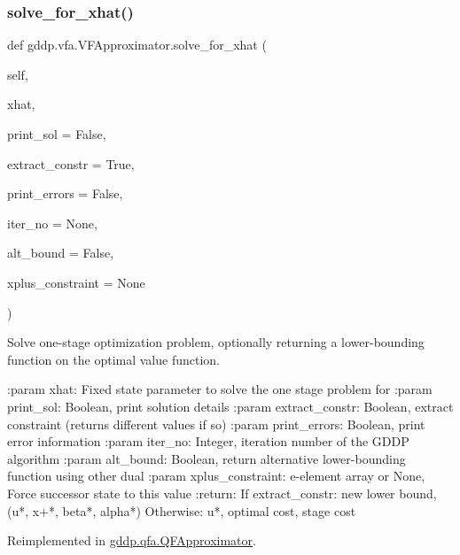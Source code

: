 \subsubsection{\texorpdfstring{solve\_for\_xhat()}{solve\_for\_xhat()}}
{\footnotesize\ttfamily def gddp.\+vfa.\+V\+F\+Approximator.\+solve\+\_\+for\+\_\+xhat (\begin{DoxyParamCaption}\item[{}]{self,  }\item[{}]{xhat,  }\item[{}]{print\+\_\+sol = {\ttfamily False},  }\item[{}]{extract\+\_\+constr = {\ttfamily True},  }\item[{}]{print\+\_\+errors = {\ttfamily False},  }\item[{}]{iter\+\_\+no = {\ttfamily None},  }\item[{}]{alt\+\_\+bound = {\ttfamily False},  }\item[{}]{xplus\+\_\+constraint = {\ttfamily None} }\end{DoxyParamCaption})}

\begin{DoxyVerb}Solve one-stage optimization problem, optionally returning a lower-bounding function
on the optimal value function.

:param xhat: Fixed state parameter to solve the one stage problem for
:param print_sol: Boolean, print solution details
:param extract_constr: Boolean, extract constraint (returns different values if so)
:param print_errors: Boolean, print error information
:param iter_no: Integer, iteration number of the GDDP algorithm
:param alt_bound: Boolean, return alternative lower-bounding function using other dual
:param xplus_constraint: e-element array or None, Force successor state to this value
:return: If extract_constr: new lower bound, (u*, x+*, beta*, alpha*)
 Otherwise: u*, optimal cost, stage cost
\end{DoxyVerb}
 

Reimplemented in \mbox{\hyperlink{classgddp_1_1qfa_1_1_q_f_approximator_aebd6f739abd857ff3f453f695a0176d3}{gddp.\+qfa.\+Q\+F\+Approximator}}.

\mbox{\label{classgddp_1_1vfa_1_1_v_f_approximator_a35cb7f0c41c6bf65e709427245fff417}} 

